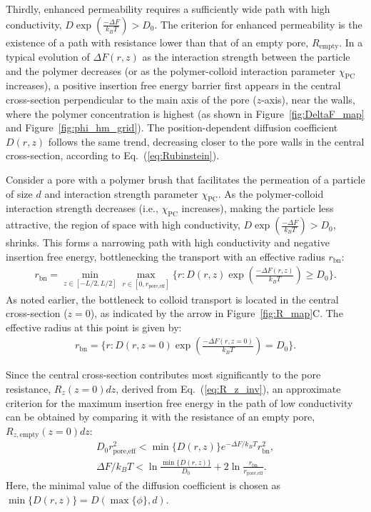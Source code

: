 \documentclass[12pt, a4paper]{article}
\begin{document}
Thirdly, enhanced permeability requires a sufficiently wide path with high conductivity, $D\exp\left(\frac{-\Delta F}{k_B T}\right) > D_0$.
The criterion for enhanced permeability is the existence of a path with resistance lower than that of an empty pore, $R_{\text{empty}}$.
In a typical evolution of $\Delta F(r,z)$ as the interaction strength between the particle and the polymer decreases (or as the polymer-colloid interaction parameter $\chi_{\text{PC}}$ increases), a positive insertion free energy barrier first appears in the central cross-section perpendicular to the main axis of the pore ($z$-axis), near the walls, where the polymer concentration is highest (as shown in Figure~\ref{fig:DeltaF_map} and Figure~\ref{fig:phi_hm_grid}).
The position-dependent diffusion coefficient $D(r,z)$ follows the same trend, decreasing closer to the pore walls in the central cross-section, according to Eq.~(\ref{eq:Rubinstein}).

Consider a pore with a polymer brush that facilitates the permeation of a particle of size $d$ and interaction strength parameter $\chi_{\text{PC}}$.
As the polymer-colloid interaction strength decreases (i.e., $\chi_{\text{PC}}$ increases), making the particle less attractive, the region of space with high conductivity, $D\exp\left(\frac{-\Delta F}{k_B T}\right) > D_0$, shrinks.
This forms a narrowing path with high conductivity and negative insertion free energy, bottlenecking the transport with an effective radius $r_{\text{bn}}$:
\begin{eqnarray}
    r_{\text{bn}} = \min_{z \in [-L/2, L/2]}\max_{r \in [0, r_{\text{pore,eff}}]}\{r : D(r, z)\exp\left(\frac{-\Delta F(r,z)}{k_B T}\right) \ge D_{0}\}.
\end{eqnarray}
As noted earlier, the bottleneck to colloid transport is located in the central cross-section ($z = 0$), as indicated by the arrow in Figure~\ref{fig:R_map}C. The effective radius at this point is given by:
\begin{eqnarray}
    r_{\text{bn}} = \{r : D(r, z=0)\exp\left(\frac{-\Delta F(r,z=0)}{k_B T}\right) = D_{0}\}.
\end{eqnarray}

Since the central cross-section contributes most significantly to the pore resistance, $R_{z}(z=0)dz$, derived from Eq.~(\ref{eq:R_z_inv}), an approximate criterion for the maximum insertion free energy in the path of low conductivity can be obtained by comparing it with the resistance of an empty pore, $R_{z, \text{empty}}(z=0)dz$:
\begin{eqnarray}
    D_0 r_{\text{pore,eff}}^{2} < \min\{D(r,z)\} e^{-\Delta F / k_B T} r_{\text{bn}}^2, \\
    \label{eq:max_energy_path}
    \Delta F / k_B T < \ln \frac{\min\{D(r,z)\}}{D_0} + 2 \ln \frac{r_{\text{bn}}}{r_{\text{pore,eff}}}.
\end{eqnarray}
Here, the minimal value of the diffusion coefficient is chosen as $\min\{D(r,z)\} = D(\max\{\phi\}, d)$.
\end{document}
